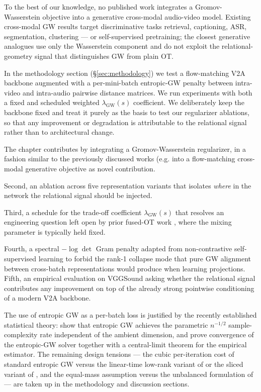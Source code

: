 To the best of our knowledge, no published work integrates a
Gromov-Wasserstein objective into a generative cross-modal
audio-video model. Existing cross-modal GW results target
discriminative tasks retrieval, captioning, ASR, segmentation,
clustering --- or self-supervised pretraining; the closest
generative analogues \citep{wang_2024_inverse, rho_2025_lavcap, you_2025_mover} use
only the Wasserstein component and do not exploit the
relational-geometry signal that distinguishes GW from plain OT.

In the methodology section (\S\ref{sec:methodology}) we test a flow-matching V2A backbone augmented
with a per-mini-batch entropic-GW penalty between intra-video and
intra-audio pairwise distance matrices. We run experiments with both a fixed and scheduled weighted $\lambda_{\mathrm{GW}}(s)$ coefficient. We deliberately keep the backbone fixed and treat it purely as the basis to test our regularizer ablations, so that any improvement or degradation is attributable to the relational signal rather than to architectural change. 

The chapter contributes by integrating a Gromov-Wasserstein regularizer, in a fashion similar to the previously discussed works (e.g. \citet{chen_2020_graph, zhou2025fusedgromovwassersteincontrastivelearning} into a flow-matching cross-modal
generative objective as novel contribution.  
 

Second, an ablation across five
representation variants that isolates \emph{where} in the network the
relational signal should be injected. 

Third, a schedule for the
trade-off coefficient $\lambda_{\mathrm{GW}}(s)$ that resolves an
engineering question left open by prior fused-OT work
\citep{chen_2020_graph, vayer_2019_optimal}, where the mixing
parameter is typically held fixed. 

Fourth, a spectral
$-\log\det$ Gram penalty \citep{ozsoy_2022_corinfomax} adapted
from non-contrastive self-supervised learning
\citep{bardes_2022_vicreg, zbontar_2021_barlow,
ermolov_2021_whitening} to forbid the rank-1 collapse mode that
pure GW alignment between cross-batch representations would produce when learning projections.
Fifth, an empirical evaluation on VGGSound asking whether the
relational signal contributes any improvement on top of the
already strong pointwise conditioning of a modern V2A backbone.


The use of entropic GW as a per-batch loss is justified by the
recently established statistical theory:
\citet{zhang_2024_gromov} show that entropic GW achieves the
parametric $n^{-1/2}$ sample-complexity rate independent of the
ambient dimension, and \citet{rioux_2023_entropic} prove
convergence of the entropic-GW solver together with a
central-limit theorem for the empirical estimator. The remaining
design tensions --- the cubic per-iteration cost of standard
entropic GW versus the linear-time low-rank variant of
\citet{scetbon_2022_lineartime} or the sliced variant of
\citet{vayer_2019_sliced}, and the equal-mass assumption versus
the unbalanced formulation of \citet{sejourne_2021_unbalanced}
--- are taken up in the methodology and discussion sections.

